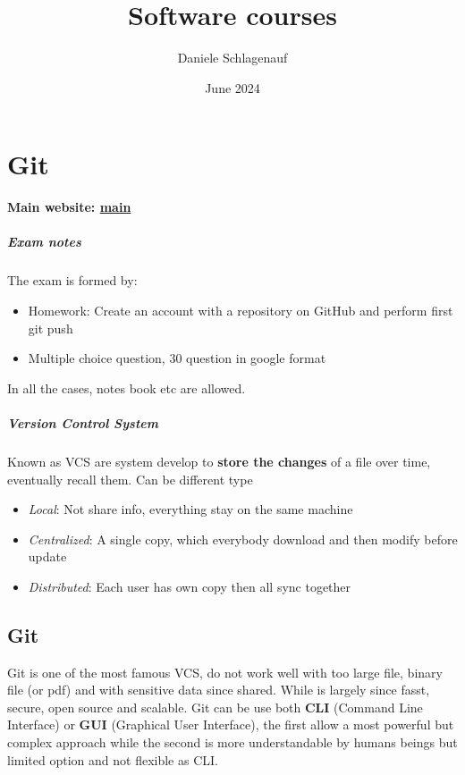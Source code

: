 \documentclass{report}
\title{Software courses}
\author{Daniele Schlagenauf}
\date{June 2024}
\begin{document}
\maketitle

\chapter{Git}
\textbf{Main website: \href{https://git-scm.com/docs}{main}}

\paragraph{Exam notes}
The exam is formed by:
\begin{itemize}
    \item Homework: Create an account with a repository on GitHub and perform first git push
    \item Multiple choice question, 30 question in google format  
\end{itemize}
In all the cases, notes book etc are allowed.

\paragraph{Version Control System}
Known as VCS are system develop to \textbf{store the changes} of a file over time, eventually recall them. Can be different type
\begin{itemize}
    \item \textit{Local}: Not share info, everything stay on the same machine 
    \item \textit{Centralized}:  A single copy, which everybody download and then modify before 
    update
    \item \textit{Distributed}: Each user has own copy then all sync together 
\end{itemize}

\section{Git}
Git is one of the most famous VCS, do not work well with too large file, binary file (or pdf) and with sensitive data since shared. While is largely since fasst, secure, open source and scalable.
\vspace{2mm}
Git can be use both \textbf{CLI} (Command Line Interface) or \textbf{GUI} (Graphical User Interface), the first allow a most powerful but complex approach while the second is more understandable by humans beings but limited option and not flexible as CLI.
\end{document}
